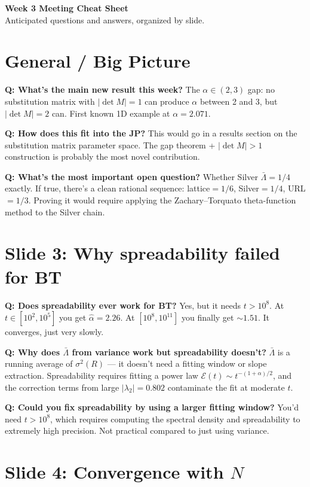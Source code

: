 \documentclass[11pt]{article}
\newcommand{\Q}[1]{\textcolor{qcolor}{\textbf{Q: #1}}}
\begin{document}
{\Large\textbf{Week 3 Meeting Cheat Sheet}}\\[0.3em]
Anticipated questions and answers, organized by slide.

\section{General / Big Picture}

\Q{What's the main new result this week?}
The $\alpha\in(2,3)$ gap: no substitution matrix with $|\det M|=1$ can produce $\alpha$ between 2 and 3, but $|\det M|=2$ can. First known 1D example at $\alpha=2.071$.

\Q{How does this fit into the JP?}
This would go in a results section on the substitution matrix parameter space. The gap theorem + $|\det M|>1$ construction is probably the most novel contribution.

\Q{What's the most important open question?}
Whether Silver $\bar\Lambda = 1/4$ exactly. If true, there's a clean rational sequence: lattice$=1/6$, Silver$=1/4$, URL$=1/3$. Proving it would require applying the Zachary--Torquato theta-function method to the Silver chain.

\section{Slide 3: Why spreadability failed for BT}

\Q{Does spreadability ever work for BT?}
Yes, but it needs $t > 10^8$. At $t\in[10^2, 10^5]$ you get $\hat\alpha = 2.26$. At $[10^8, 10^{11}]$ you finally get ${\sim}1.51$. It converges, just very slowly.

\Q{Why does $\bar\Lambda$ from variance work but spreadability doesn't?}
$\bar\Lambda$ is a running average of $\sigma^2(R)$ --- it doesn't need a fitting window or slope extraction. Spreadability requires fitting a power law $\mathcal{E}(t) \sim t^{-(1+\alpha)/2}$, and the correction terms from large $|\lambda_2| = 0.802$ contaminate the fit at moderate $t$.

\Q{Could you fix spreadability by using a larger fitting window?}
You'd need $t > 10^8$, which requires computing the spectral density and spreadability to extremely high precision. Not practical compared to just using variance.

\section{Slide 4: Convergence with $N$}
\end{document}
